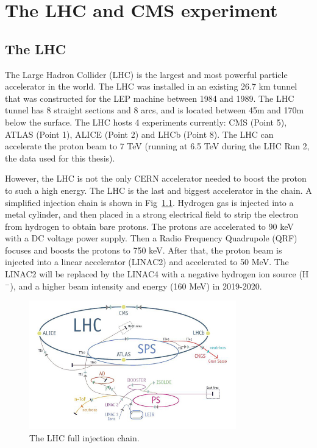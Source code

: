 \chapter{The LHC and CMS experiment}

\section{The LHC}

The Large Hadron Collider (LHC) is the largest and most powerful particle accelerator in the world. The LHC was installed in an existing 26.7 km tunnel that was constructed for the LEP machine between 1984 and 1989. The LHC tunnel has 8 straight sections and 8 arcs, and is located between 45m and 170m below the surface. The LHC hosts 4 experiments currently: CMS (Point 5), ATLAS (Point 1), ALICE (Point 2) and LHCb (Point 8). The LHC can accelerate the proton beam to 7 TeV (running at 6.5 TeV during the LHC Run 2, the data used for this thesis).

However, the LHC is not the only CERN accelerator needed to boost the proton to such a high energy. The LHC is the last and biggest accelerator in the chain. A simplified injection chain is shown in Fig~\ref{fig:c3lhclpsspslhc}. Hydrogen gas is injected into a metal cylinder, and then placed in a strong electrical field to strip the electron from hydrogen to obtain bare protons. The protons are accelerated to 90 keV with a DC voltage power supply. Then a Radio Frequency Quadrupole (QRF) focuses and boosts the protons to 750 keV. After that, the proton beam is injected into a linear accelerator (LINAC2) and accelerated to 50 MeV. The LINAC2 will be replaced by the LINAC4 with a negative hydrogen ion source (H$^{-}$), and a higher beam intensity and energy (160 MeV) in 2019-2020. 

\begin{figure}[htbp]
 \begin{center}
  \includegraphics[width=0.8\textwidth]{figures/c3/c3_lhc_lpsspslhc.jpg}
 \end{center}
 \caption{The LHC full injection chain.}
 \label{fig:c3lhclpsspslhc}
\end{figure}

